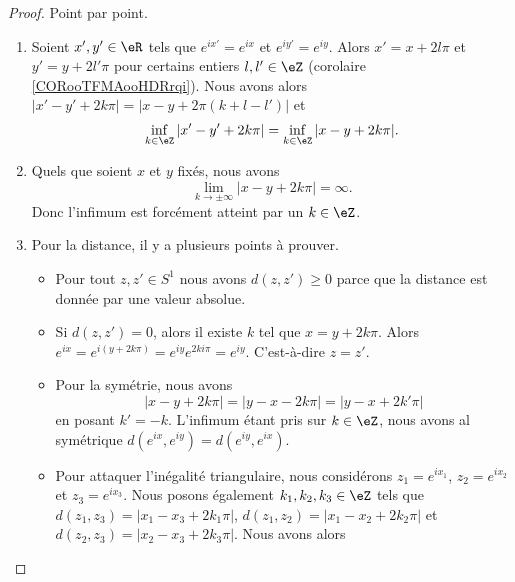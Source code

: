 \begin{proof}
    Point par point.
    \begin{enumerate}
        \item
            Soient \( x',y'\in \eR\) tels que \(  e^{ix'}= e^{ix}\) et \(  e^{iy'}= e^{iy}\). Alors \( x'=x+2l\pi\) et \( y'=y+2l'\pi\) pour certains entiers \( l,l'\in \eZ\) (corolaire \ref{CORooTFMAooHDRrqi}). Nous avons alors \( | x'-y'+2k\pi |=| x-y+2\pi(k+l-l') |\) et
            \begin{equation}
                \inf_{k\in \eZ}| x'-y'+2k\pi |=\inf_{k\in \eZ}| x-y+2k\pi |.
            \end{equation}
        \item
            Quels que soient \( x\) et \( y\) fixés, nous avons
            \begin{equation}
                \lim_{k\to \pm\infty} | x-y+2k\pi |=\infty.
            \end{equation}
            Donc l'infimum est forcément atteint par un \( k\in \eZ\).
        \item
            Pour la distance, il y a plusieurs points à prouver. 
            \begin{itemize}
                \item 
                    Pour tout \( z,z'\in S^1\) nous avons \( d(z,z')\geq 0\) parce que la distance est donnée par une valeur absolue.
                \item
                    Si \( d(z,z')=0\), alors il existe \( k\) tel que \( x=y+2k\pi\). Alors \(  e^{ix}= e^{i(y+2k\pi)}= e^{iy} e^{2ki\pi}= e^{iy}\). C'est-à-dire \( z=z'\).
                \item
                    Pour la symétrie, nous avons
                    \begin{equation}
                        | x-y+2k\pi |=| y-x-2k\pi |=| y-x+2k'\pi |
                    \end{equation}
                    en posant \( k'=-k\). L'infimum étant pris sur \( k\in \eZ\), nous avons al symétrique \( d( e^{ix},  e^{iy})=d( e^{iy}, e^{ix})\).
                \item
                    Pour attaquer l'inégalité triangulaire, nous considérons \( z_1= e^{ix_1}\), \( z_2= e^{ix_2}\) et \( z_3= e^{ix_3}\). Nous posons également \( k_1,k_2, k_3\in \eZ\) tels que \( d(z_1,z_3)=| x_1-x_3+2k_1\pi | \), \( d(z_1,z_2)=| x_1-x_2+2k_2\pi |\) et \( d(z_2,z_3)=| x_2-x_3+2k_3\pi |\). Nous avons alors
                    \begin{subequations}

\end{subequations}
\end{itemize}
\end{enumerate}
\end{proof}
